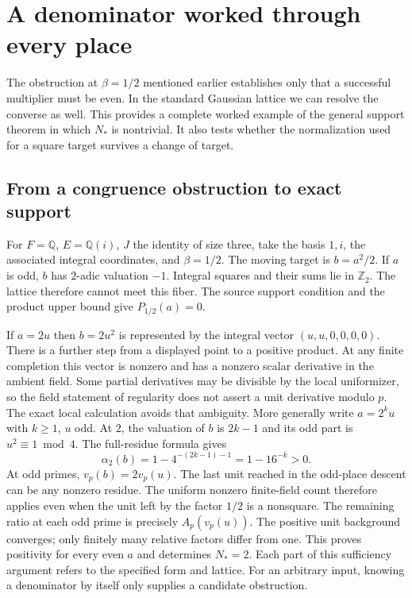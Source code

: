 \documentclass[12pt,letterpaper]{article}
\begin{document}
\section{A denominator worked through every place}\label{sec:denominator}
The obstruction at $\beta=1/2$ mentioned earlier establishes only that a successful multiplier must be even. In the standard Gaussian lattice we can resolve the converse as well. This provides a complete worked example of the general support theorem in which $N_*$ is nontrivial. It also tests whether the normalization used for a square target survives a change of target.

\subsection{From a congruence obstruction to exact support}
For $F=\mathbb Q$, $E=\mathbb Q(i)$, $J$ the identity of size three, take the basis $1,i$, the associated integral coordinates, and $\beta=1/2$. The moving target is $b=a^2/2$. If $a$ is odd, $b$ has $2$-adic valuation $-1$. Integral squares and their sums lie in $\mathbb Z_2$. The lattice therefore cannot meet this fiber. The source support condition and the product upper bound give $P_{1/2}(a)=0$.

If $a=2u$ then $b=2u^2$ is represented by the integral vector $(u,u,0,0,0,0)$. There is a further step from a displayed point to a positive product. At any finite completion this vector is nonzero and has a nonzero scalar derivative in the ambient field. Some partial derivatives may be divisible by the local uniformizer, so the field statement of regularity does not assert a unit derivative modulo $p$. The exact local calculation avoids that ambiguity. More generally write $a=2^ku$ with $k\ge1$, $u$ odd. At $2$, the valuation of $b$ is $2k-1$ and its odd part is $u^2\equiv1\bmod4$. The full-residue formula gives
\[
             \alpha_2(b)=1-4^{-(2k-1)-1}=1-16^{-k}>0 .
\]
At odd primes, $v_p(b)=2v_p(u)$. The last unit reached in the odd-place descent can be any nonzero residue. The uniform nonzero finite-field count therefore applies even when the unit left by the factor $1/2$ is a nonsquare. The remaining ratio at each odd prime is precisely $A_p(v_p(u))$. The positive unit background converges; only finitely many relative factors differ from one. This proves positivity for every even $a$ and determines $N_*=2$. Each part of this sufficiency argument refers to the specified form and lattice. For an arbitrary input, knowing a denominator by itself only supplies a candidate obstruction.
\end{document}
